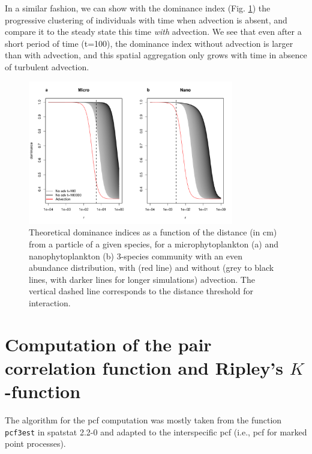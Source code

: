 \documentclass[english]{article}
\begin{document}
In a similar fashion, we can show with the dominance index (Fig. \ref{fig:Theoretical-dom})
the progressive clustering of individuals with time when advection
is absent, and compare it to the steady state  this time \emph{with}
advection. We see that even after a short period of time (t=100),
the dominance index without advection is larger than with advection,
and this spatial aggregation only grows with time in absence of turbulent
advection.

\begin{figure}[H]
\begin{centering}
\includegraphics[width=0.8\textwidth]{../code/figure/theory_dominance}
\par\end{centering}
\caption{Theoretical dominance indices as a function of the distance (in cm)
from a particle of a given species, for a microphytoplankton (a) and
nanophytoplankton (b) 3-species community with an even abundance distribution,
with (red line) and without (grey to black lines, with darker lines
for longer simulations) advection. The vertical dashed line corresponds
to the distance threshold for interaction. \label{fig:Theoretical-dom}}
\end{figure}


\section{Computation of the pair correlation function and Ripley's $K$-function}

The algorithm for the pcf computation was mostly taken from the function
\verb|pcf3est| in spatstat 2.2-0 \citep{baddeley_spatstat} and adapted
to the interspecific pcf (i.e., pcf for marked point processes).
\end{document}

